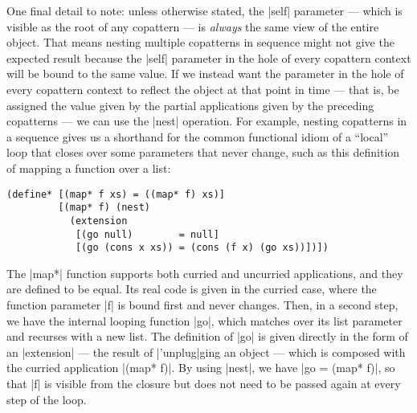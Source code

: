 One final detail to note: unless otherwise stated, the \scm|self| parameter --- which is visible as the root of any copattern --- is \emph{always} the same view of the entire object.
That means nesting multiple copatterns in sequence might not give the expected result because the \scm|self| parameter in the hole of every copattern context will be bound to the same value.
If we instead want the parameter in the hole of every copattern context to reflect the object at that point in time --- that is, be assigned the value given by the partial applications given by the preceding copatterns --- we can use the \scm|nest| operation.
For example, nesting copatterns in a sequence gives us a shorthand for the common functional idiom of a ``local'' loop that closes over some parameters that never change, such as this definition of mapping a function over a list:
\begin{lstlisting}[language=Scm]
(define* [(map* f xs) = ((map* f) xs)]
         [(map* f) (nest)
           (extension
            [(go null)        = null]
            [(go (cons x xs)) = (cons (f x) (go xs))])])
\end{lstlisting}
The \scm|map*| function supports both curried and uncurried applications, and they are defined to be equal.
Its real code is given in the curried case, where the function parameter \scm|f| is bound first and never changes.
Then, in a second step, we have the internal looping function \scm|go|, which matches over its list parameter and recurses with a new list.
The definition of \scm|go| is given directly in the form of an \scm|extension| --- the result of \scm|'unplug|ging an object --- which is composed with the curried application \scm|(map* f)|.
By using \scm|nest|, we have \scm|go = (map* f)|, so that \scm|f| is visible from the closure but does not need to be passed again at every step of the loop.



